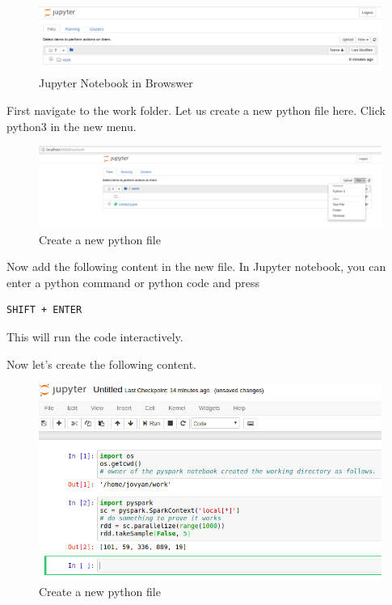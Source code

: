 \begin{figure}[htbp]
\centering
\includegraphics[width=1.0\textwidth]{images/docker-spark-jup-1.png}
\caption{Jupyter Notebook in Browswer}
\end{figure}

First navigate to the work folder. Let us create a new python file here.
Click python3 in the new menu.

\begin{figure}[htbp]
\centering
\includegraphics[width=1.0\textwidth]{images/docker-spark-jup-2.png}
\caption{Create a new python file}
\end{figure}

Now add the following content in the new file. In Jupyter notebook, you
can enter a python command or python code and press

\begin{lstlisting}
SHIFT + ENTER
\end{lstlisting}

This will run the code interactively.

Now let's create the following content.

\begin{figure}[htbp]
\centering
\includegraphics[width=1.0\textwidth]{images/docker-spark-jup-3.png}
\caption{Create a new python file}
\end{figure}

